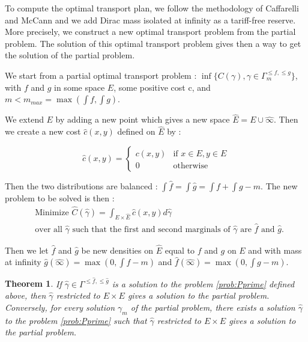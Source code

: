\documentclass[a4paper,11pt]{article}
\newtheorem{theorem}{Theorem}
\theoremstyle{definition}
\begin{document}
To compute the optimal transport plan, we follow the methodology of Caffarelli and McCann \cite{caff} and we add Dirac mass isolated at infinity as a tariff-free reserve. \\

More precisely, we construct a new optimal transport problem from the partial problem. The solution of this optimal transport problem gives then a way to get the solution of the partial problem. 

We start from a partial optimal transport problem : $\inf \{C(\gamma),\gamma \in \Gamma^{\leq f,\leq g}_m \}$,  with $f$ and $g$ in some space $E$, some positive cost c, and $m<m_{max}=\max(\int f, \int g)$.


We extend $E$ by adding a new point which gives a new space $\hat E=E \cup \hat \infty$. Then we create a new cost $\hat c(x,y)$ defined on $\hat E$ by : 

$$\hat c(x,y) = \begin{cases}
c(x,y) & \text{if } x \in E, y\in E \\
0 & \text{otherwise}
\end{cases}
$$

Then the two distributions are balanced : $\int \hat f =\int \hat g = \int f + \int g -m$. The new problem to be solved is then : 
\begin{equation}
\tag{$\hat P$}
\begin{aligned}
    \label{prob:Pprime}
    &\text{Minimize }  \hat C(\hat \gamma) = \int_{\hat E \times \hat E} \hat c(x,y) d\hat \gamma \\
    &\text{over all } \hat \gamma \text{ such that the first and second marginals of } \hat \gamma \text{ are } \hat f \text{ and  } \hat g.
\end{aligned}
\end{equation}

Then we let $\hat f$ and $\hat g$ be new densities on $\hat{E}$ equal to $f$ and $g$ on $E$ and with mass at infinity $\hat g(\hat \infty) = \max(0,\int f-m)$ and $\hat f(\hat \infty) = \max(0,\int g-m)$.

\begin{theorem}
    If $\hat \gamma \in \Gamma^{\leq \hat f,\leq \hat g}$ is a solution to the problem \ref{prob:Pprime} defined above, then $\hat \gamma$ restricted to $E \times E$ gives a solution to the partial problem. \\
    Conversely, for every solution $\gamma_m$ of the partial problem, there exists a solution $\hat \gamma$ to the problem \ref{prob:Pprime} such that $\hat \gamma$ restricted to $E \times E$ gives a solution to the partial problem.
\end{theorem}
\end{document}
